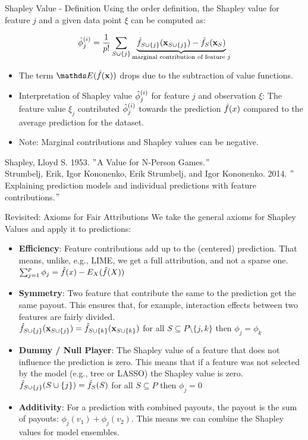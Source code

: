 \documentclass[11pt,compress,t,notes=noshow, xcolor=table]{beamer}
\begin{document}
\begin{vbframe}{Shapley Value - Definition}
  Using the order definition, the Shapley value for feature $j$ and a given data point $\xi$ can be computed as:

     $$ \phiij  = \frac{1}{p!} \sum_{\Scupj} \underbrace{\fh_{\Scupj}(\xv_{\Scupj}) - \fh_{S}(\xv_{S})}_{\text{marginal contribution of feature $j$}} $$
\begin{itemize}
    \item The term $\E(\fh(\xv))$ drops due to the subtraction of value functions.
  \item Interpretation of Shapley value $\phiij$ for feature $j$ and observation $\xi$:
  The feature value $\xi_{j}$ contributed $\phiij$ towards the prediction $\fh(x)$ compared to the average prediction for the dataset.
   \item Note: Marginal contributions and Shapley values can be negative.
\end{itemize}
\lz
\tiny
Shapley, Lloyd S. 1953. $"$A Value for N-Person Games.$"$\\
\vspace{0.2cm}
Strumbelj, Erik, Igor Kononenko, Erik Strumbelj, and Igor Kononenko. 2014. $"$Explaining prediction models and individual predictions with feature contributions.$"$

\end{vbframe}



\begin{vbframe}{Revisited: Axioms for Fair Attributions}
  We take the general axioms for Shapley Values and apply it to predictions:
  \begin{itemize}
    \item \textbf{Efficiency}: Feature contributions add up to the (centered) prediction. That means, unlike, e.g., LIME, we get a full attribution, and not a sparse one.
      $\sum\nolimits_{j=1}^p\phi_j=\hat{f}(x)-E_X(\fh(X))$
    \item \textbf{Symmetry}: Two feature that contribute the same to the prediction get the same payout. This ensures that, for example, interaction effects between two features are fairly divided. \\
      $\fh_{S\cup\{j\}}(\xv_{\Scupj}) = \fh_{\Scupk}(\xv_{\Scupk})$ for all $S \subseteq P\setminus\{j,k\}$ then $\phi_j=\phi_k$
    \item \textbf{Dummy / Null Player}: The Shapley value of a feature that does not influence the prediction is zero. This means that if a feature was not selected by the model (e.g., tree or LASSO) the Shapley value is zero.  \\
      $\fh_{\Scupj}(\Scupj)=\fhS(S)$ for all $S \subseteq P$ then $\phi_j=0$
    \item \textbf{Additivity}:  For a prediction with combined payouts, the
      payout is the sum of payouts: $\phi_j(v_1) + \phi_j(v_2)$. This means we can combine the Shapley values for model ensembles.
  \end{itemize}
\end{vbframe}
\end{document}
